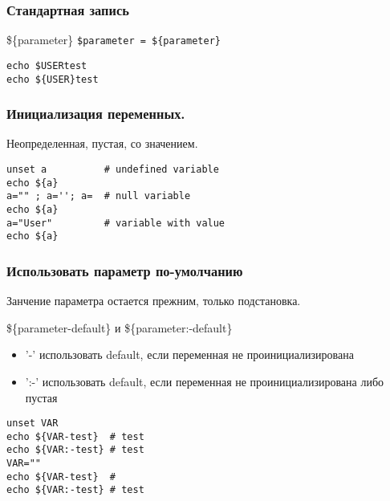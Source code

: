 

\begin{frame}[fragile]
	\frametitle{Стандартная запись}

	\begin{block}{\$\{parameter\}}
		{\tt \$parameter = \$\{parameter\}}

	\begin{lstlisting}
echo $USERtest
echo ${USER}test
\end{lstlisting}
	\end{block}

\end{frame}

\begin{frame}[fragile]
	\frametitle{Инициализация переменных.}

	\begin{block}{Неопределенная, пустая, со значением.}
	\begin{lstlisting}
unset a          # undefined variable
echo ${a}
a="" ; a=''; a=  # null variable
echo ${a}
a="User"         # variable with value
echo ${a}
\end{lstlisting}
	\end{block}

\end{frame}

\begin{frame}[fragile]
	\frametitle{ Использовать параметр по-умолчанию}

                Занчение параметра остается прежним, только подстановка.
	\begin{block}{\$\{parameter-default\} и \$\{parameter:-default\}}
	\begin{itemize}
		\item '-' использовать default, если переменная не проинициализирована
		\item ':-' использовать default, если переменная не проинициализирована либо пустая
	\end{itemize}
	\begin{lstlisting}
unset VAR
echo ${VAR-test}  # test
echo ${VAR:-test} # test
VAR=""
echo ${VAR-test}  #
echo ${VAR:-test} # test
\end{lstlisting}
	\end{block}

\end{frame}

